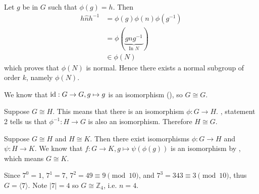 \begin{questions}
    Let $g$ be in $G$ such that $\phi(g) = h$. Then
    \begin{align*}
        h\hat{n}h^{-1} &= \phi(g)\phi(n)\phi(g^{-1})\\
        &= \phi(\underbrace{gng^{-1}}_{\text{In } N})\\
        &\in \phi(N)
    \end{align*}
    which proves that $\phi(N)$ is normal. Hence there exists a normal subgroup of order $k$, namely $\phi(N)$.

    \item \begin{partquestions}{\alph*}
        \item We know that $\mathrm{id}: G \to G, g \mapsto g$ is an isomorphism (), so $G \cong G$.
        \item Suppose $G \cong H$. This means that there is an isomorphism $\phi: G \to H$. , statement 2 tells us that $\phi^{-1}: H \to G$ is also an isomorphism. Therefore $H \cong G$.
        \item Suppose $G \cong H$ and $H \cong K$. Then there exist isomorphisms $\phi: G \to H$ and $\psi: H \to K$. We know that $f: G \to K, g \mapsto \psi(\phi(g))$ is an isomorphism by , which means $G \cong K$.
    \end{partquestions}

    \item Since $7^0 = 1$, $7^1 = 7$, $7^2 = 49 \equiv 9 \pmod{10}$, and $7^3 = 343 \equiv 3 \pmod{10}$, thus $G = \langle 7 \rangle$. Note $|7| = 4$ so $G \cong \mathbb{Z}_4$, i.e. $n = 4$.
\end{questions}